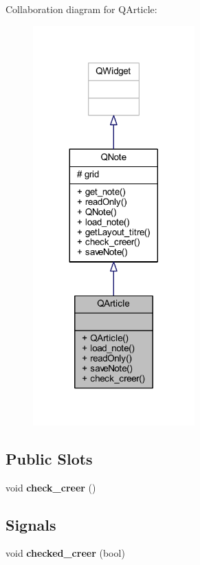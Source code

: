 Collaboration diagram for Q\+Article\+:
\nopagebreak
\begin{figure}[H]
\begin{center}
\leavevmode
\includegraphics[width=176pt]{class_q_article__coll__graph}
\end{center}
\end{figure}
\subsection*{Public Slots}
\begin{DoxyCompactItemize}
\item 
\mbox{\label{class_q_article_a1d1a9f629113e6135bce19a9c84b03e9}} 
void {\bfseries check\+\_\+creer} ()
\end{DoxyCompactItemize}
\subsection*{Signals}
\begin{DoxyCompactItemize}
\item 
\mbox{\label{class_q_article_a73232df813fe69c96a47ddf43a04c0ad}} 
void {\bfseries checked\+\_\+creer} (bool)
\end{DoxyCompactItemize}
